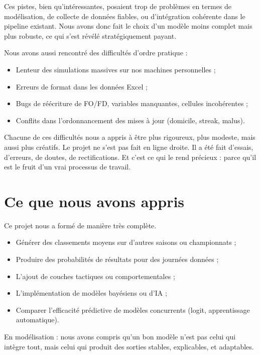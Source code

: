 \documentclass[12pt]{report}
\begin{document}
Ces pistes, bien qu’intéressantes, posaient trop de problèmes en termes de modélisation, de collecte de données fiables, ou d’intégration cohérente dans le pipeline existant. Nous avons donc fait le choix d’un modèle moins complet mais plus robuste, ce qui s’est révélé stratégiquement payant.

Nous avons aussi rencontré des difficultés d’ordre pratique :\\
\begin{itemize}
  \item Lenteur des simulations massives sur nos machines personnelles ;
  \item Erreurs de format dans les données Excel ;
  \item Bugs de réécriture de FO/FD, variables manquantes, cellules incohérentes ;
  \item Conflits dans l’ordonnancement des mises à jour (domicile, streak, malus).\\
\end{itemize}

Chacune de ces difficultés nous a appris à être plus rigoureux, plus modeste, mais aussi plus créatifs. Le projet ne s’est pas fait en ligne droite. Il a été fait d’essais, d’erreurs, de doutes, de rectifications. Et c’est ce qui le rend précieux : parce qu’il est le fruit d’un vrai processus de travail.

\section{Ce que nous avons appris}


Ce projet nous a formé de manière très complète.\\
\begin{itemize}
\item Générer des classements moyens sur d’autres saisons ou championnats ;
\item Produire des probabilités de résultats pour des journées données ;
\item L’ajout de couches tactiques ou comportementales ;
\item L’implémentation de modèles bayésiens ou d’IA ;
\item Comparer l’efficacité prédictive de modèles concurrents (logit, apprentissage automatique).\
\end{itemize}
En modélisation : nous avons compris qu’un bon modèle n’est pas celui qui intègre tout, mais celui qui produit des sorties stables, explicables, et adaptables.
\end{document}
